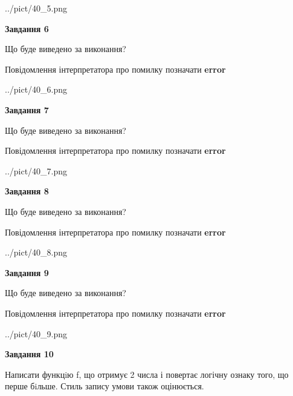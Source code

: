 \documentclass[12pt, ukrainian]{article}
\begin{document}
{\begin {large}
\begin{center}
	{../pict/40_5.png}
\end{center}
\newpage

{\begin {center}\textbf{Завдання 6}\end {center}}\par
Що буде виведено за виконання? \par
Повідомлення інтерпретатора про помилку позначати \textbf{error}

\begin{center}
	{../pict/40_6.png}
\end{center}
\newpage

{\begin {center}\textbf{Завдання 7}\end {center}}\par
Що буде виведено за виконання? \par
Повідомлення інтерпретатора про помилку позначати \textbf{error}

\begin{center}
	{../pict/40_7.png}
\end{center}
\newpage

{\begin {center}\textbf{Завдання 8}\end {center}}\par
Що буде виведено за виконання? \par
Повідомлення інтерпретатора про помилку позначати \textbf{error}

\begin{center}
	{../pict/40_8.png}
\end{center}
\newpage

{\begin {center}\textbf{Завдання 9}\end {center}}\par
Що буде виведено за виконання? \par
Повідомлення інтерпретатора про помилку позначати \textbf{error}

\begin{center}
	{../pict/40_9.png}
\end{center}
\newpage

{\begin {center}\textbf{Завдання 10}\end {center}}\par

Написати функцiю f, що отримує 2 числа і повертає логічну ознаку того, що перше бiльше. Стиль запису умови також оцінюється.\par
\newpage

\end {large}}
\end{document}
